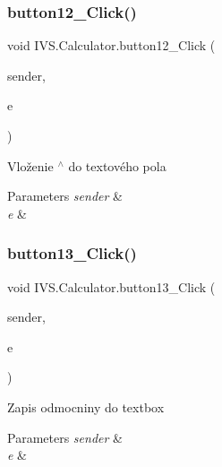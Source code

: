 \subsubsection{\texorpdfstring{button12\+\_\+\+Click()}{button12\_Click()}}
{\footnotesize\ttfamily void I\+V\+S.\+Calculator.\+button12\+\_\+\+Click (\begin{DoxyParamCaption}\item[{object}]{sender,  }\item[{Event\+Args}]{e }\end{DoxyParamCaption})\hspace{0.3cm}{\ttfamily [protected]}}



Vloženie \textquotesingle{}$^\wedge$\textquotesingle{} do textového pola 


\begin{DoxyParams}{Parameters}
{\em sender} & \\
\hline
{\em e} & \\
\hline
\end{DoxyParams}
\mbox{\label{class_i_v_s_1_1_calculator_a03fca7b882c86953efac6a229c1289db}} 
\subsubsection{\texorpdfstring{button13\+\_\+\+Click()}{button13\_Click()}}
{\footnotesize\ttfamily void I\+V\+S.\+Calculator.\+button13\+\_\+\+Click (\begin{DoxyParamCaption}\item[{object}]{sender,  }\item[{Event\+Args}]{e }\end{DoxyParamCaption})\hspace{0.3cm}{\ttfamily [protected]}}



Zapis odmocniny do textbox 


\begin{DoxyParams}{Parameters}
{\em sender} & \\
\hline
{\em e} & \\
\hline
\end{DoxyParams}
\mbox{\label{class_i_v_s_1_1_calculator_acbac3db9d87c440d5f18b67349b8cd29}} 
